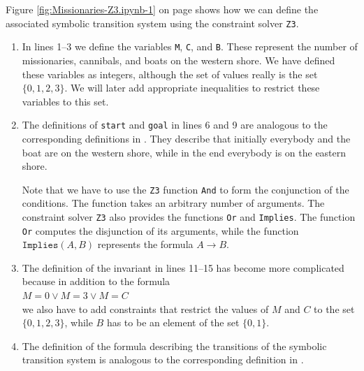 Figure \ref{fig:Missionaries-Z3.ipynb-1} on page \pageref{fig:Missionaries-Z3.ipynb-1} shows how we can define
the associated symbolic transition system using the constraint solver \texttt{Z3}.
\begin{enumerate}
\item In lines 1--3 we define the variables \texttt{M}, \texttt{C}, and \texttt{B}.  These represent the
      number of missionaries, cannibals, and boats on the western shore.  We have defined these variables as
      integers, although the set of values really is the set $\{0,1,2,3\}$.  We will later add appropriate
      inequalities to restrict these variables to this set.
\item The definitions of \texttt{start} and \texttt{goal} in lines 6 and 9 are analogous to the corresponding
      definitions in .  They describe that initially everybody and the boat are on
      the western shore, while in the end everybody is on the eastern shore.

      Note that we have to use the \texttt{Z3} function \texttt{And} to form the conjunction of the conditions.
      The function takes an arbitrary number of arguments.  The constraint solver \texttt{Z3} also provides the
      functions \texttt{Or} and \texttt{Implies}.  The function \texttt{Or} computes the disjunction of its
      arguments, while the function $\texttt{Implies}(A, B)$ represents the formula $A \rightarrow B$.
\item The definition of the invariant in lines 11--15 has become more complicated because in addition to the
      formula 
      \\[0.2cm]
      \hspace*{1.3cm}
      $M = 0 \vee M = 3 \vee M = C$
      \\[0.2cm]
      we also have to add constraints that restrict the values of $M$ and $C$ to the set $\{0, 1, 2, 3\}$,
      while $B$ has to be an element of the set $\{0,1\}$.
\item The definition of the formula describing the transitions of the symbolic transition system is 
      analogous to the corresponding definition in .
\end{enumerate}

